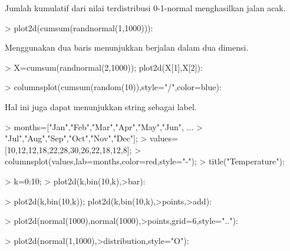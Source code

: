 \documentclass[a4paper,10pt]{article}
\begin{document}
\begin{eulernotebook}
\begin{eulercomment}
\begin{eulercomment}
\begin{eulercomment}
\begin{eulercomment}
\begin{eulercomment}
\begin{eulercomment}
\begin{eulercomment}
Jumlah kumulatif dari nilai terdistribusi 0-1-normal menghasilkan
jalan acak.
\end{eulercomment}
\begin{eulerprompt}
> plot2d(cumsum(randnormal(1,1000))):
\end{eulerprompt}
\begin{eulercomment}
Menggunakan dua baris menunjukkan berjalan dalam dua dimensi.
\end{eulercomment}
\begin{eulerprompt}
> X=cumsum(randnormal(2,1000)); plot2d(X[1],X[2]):
\end{eulerprompt}
\begin{eulerprompt}
> columnsplot(cumsum(random(10)),style="/",color=blue):
\end{eulerprompt}
\begin{eulercomment}
Hal ini juga dapat menunjukkan string sebagai label.
\end{eulercomment}
\begin{eulerprompt}
> months=["Jan","Feb","Mar","Apr","May","Jun", ...
>   "Jul","Aug","Sep","Oct","Nov","Dec"];
> values=[10,12,12,18,22,28,30,26,22,18,12,8];
> columnsplot(values,lab=months,color=red,style="-");
> title("Temperature"):
\end{eulerprompt}
\begin{eulerprompt}
> k=0:10;
> plot2d(k,bin(10,k),>bar):
\end{eulerprompt}
\begin{eulerprompt}
> plot2d(k,bin(10,k)); plot2d(k,bin(10,k),>points,>add):
\end{eulerprompt}
\begin{eulerprompt}
> plot2d(normal(1000),normal(1000),>points,grid=6,style=".."):
\end{eulerprompt}
\begin{eulerprompt}
> plot2d(normal(1,1000),>distribution,style="O"):
\end{eulerprompt}
\begin{eulerprompt}

\end{eulerprompt}
\end{eulercomment}
\end{eulercomment}
\end{eulercomment}
\end{eulercomment}
\end{eulercomment}
\end{eulercomment}
\end{eulernotebook}
\end{document}
